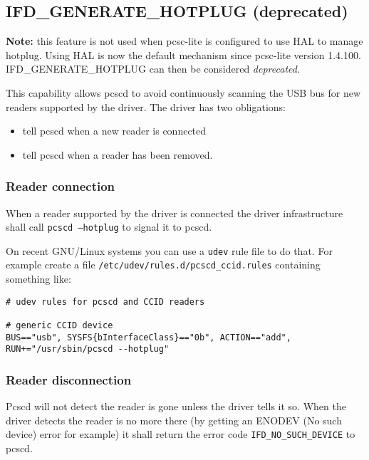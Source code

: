 \documentclass[a4paper,12pt]{article}
\begin{document}
\subsection{IFD\_GENERATE\_HOTPLUG (deprecated)}
\label{IFD_GENERATE_HOTPLUG}

\textbf{Note:} this feature is not used when pcsc-lite is configured to
use HAL to manage hotplug. Using HAL is now the default mechanism since
pcsc-lite version 1.4.100. IFD\_GENERATE\_HOTPLUG can then be considered
\emph{deprecated}.

This capability allows pcscd to avoid continuously scanning the USB bus for
new readers supported by the driver. The driver has two obligations:
\begin{itemize}
\item tell pcscd when a new reader is connected

\item tell pcscd when a reader has been removed.

\end{itemize}


\subsubsection{Reader connection}

When a reader supported by the driver is connected the driver
infrastructure shall call \texttt{pcscd --hotplug} to signal it to pcscd.

On recent GNU/Linux systems you can use a \texttt{udev} rule file to do
that.  For example create a file
\texttt{/etc/udev/rules.d/pcscd\_ccid.rules} containing something like:

\begin{verbatim}
# udev rules for pcscd and CCID readers

# generic CCID device
BUS=="usb", SYSFS{bInterfaceClass}=="0b", ACTION=="add", RUN+="/usr/sbin/pcscd --hotplug"
\end{verbatim}


\subsubsection{Reader disconnection}

Pcscd will not detect the reader is gone unless the driver tells it so.
When the driver detects the reader is no more there (by getting an ENODEV
(No such device) error for example) it shall return the error code
\texttt{IFD\_NO\_SUCH\_DEVICE} to pcscd.
\end{document}
